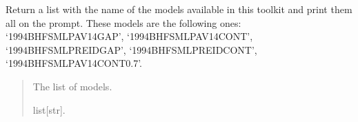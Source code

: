 \documentclass[letterpaper,10pt,english]{sphinxmanual}
\begin{document}
\begin{fulllineitems}
\label{\detokenize{source/api/setup_matter_micro_lp:nucleardatapy.matter.setup_micro_lp.micro_LP_models}}
\pysigstartsignatures
{}
\pysigstopsignatures
\sphinxAtStartPar
Return a list with the name of the models available in this toolkit and     print them all on the prompt. These models are the following ones:     ‘1994\sphinxhyphen{}BHF\sphinxhyphen{}SM\sphinxhyphen{}LP\sphinxhyphen{}AV14\sphinxhyphen{}GAP’, ‘1994\sphinxhyphen{}BHF\sphinxhyphen{}SM\sphinxhyphen{}LP\sphinxhyphen{}AV14\sphinxhyphen{}CONT’,     ‘1994\sphinxhyphen{}BHF\sphinxhyphen{}SM\sphinxhyphen{}LP\sphinxhyphen{}REID\sphinxhyphen{}GAP’, ‘1994\sphinxhyphen{}BHF\sphinxhyphen{}SM\sphinxhyphen{}LP\sphinxhyphen{}REID\sphinxhyphen{}CONT’, ‘1994\sphinxhyphen{}BHF\sphinxhyphen{}SM\sphinxhyphen{}LP\sphinxhyphen{}AV14\sphinxhyphen{}CONT\sphinxhyphen{}0.7’.
\begin{quote}\begin{description}
\sphinxAtStartPar
The list of models.

\sphinxAtStartPar
list{[}str{]}.

\end{description}\end{quote}

\end{fulllineitems}

\end{document}
